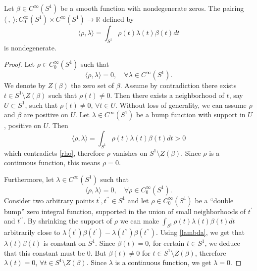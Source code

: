 \documentclass[10pt,a4paper]{amsart}
\newcommand\RR{\mathbb R}
\begin{document}
\begin{lemma}
Let $\beta \in C^\infty(S^1)$ be a smooth function with nondegenerate zeros. The pairing $\langle \ , \ \rangle: C_0^\infty(S^1) \times C^\infty(S^1) \to \RR$ defined by
\begin{equation}\label{pairing}
\langle\rho, \lambda\rangle = \int_{S^1}\rho(t)\lambda(t)\beta(t)dt
\end{equation}
is nondegenerate.
\end{lemma}

\begin{proof}
Let $\rho\in C_0^\infty(S^1)$ such that 
\begin{equation}\label{rho}
\langle\rho,\lambda\rangle = 0, \quad \forall \lambda \in C^\infty(S^1).
\end{equation} 
We denote by $Z(\beta)$ the zero set of $\beta$. Assume by contradiction there exists $t \in S^1\setminus Z(\beta)$ such that $\rho(t) \neq 0$. Then there exists a neighborhood of $t$, say $U \subset S^1$, such that $\rho(t) \neq 0$, $\forall t \in U$. Without loss of generality, we can assume $\rho$ and $\beta$ are positive on $U$. Let $\lambda \in C^\infty(S^1)$ be a bump function with support in $U$, positive on $U$. Then 
\begin{equation*}
\langle\rho, \lambda\rangle = \int_{S^1}\rho(t)\lambda(t)\beta(t)dt > 0
\end{equation*}
which contradicts \eqref{rho}, therefore $\rho$ vanishes on $S^1\setminus Z(\beta)$. Since $\rho$ is a continuous function, this means $\rho = 0$. 

Furthermore, let $\lambda \in C^\infty(S^1)$ such that 
\begin{equation}\label{lambda}
\langle\rho, \lambda\rangle = 0, \quad \forall \rho \in C_0^\infty(S^1). 
\end{equation}
Consider two arbitrary points $t^\prime, t^{\prime\prime} \in S^1$ and let $\rho \in C_0^\infty(S^1)$ be a ``double bump'' zero integral function, supported in the union of small neighborhoods of $t^\prime$ and $t^{\prime\prime}$. By shrinking the support of $\rho$ we can make $\int_{S^1}\rho(t)\lambda(t)\beta(t)dt$ arbitrarily close to $\lambda(t^\prime)\beta(t^\prime) - \lambda(t^{\prime\prime})\beta(t^{\prime\prime})$. Using \eqref{lambda}, we get that $\lambda(t)\beta(t)$ is constant on $S^1$. Since $\beta(t) = 0$, for certain $t \in S^1$, we deduce that this constant must be 0. But $\beta(t) \neq 0$ for $t \in S^1 \setminus Z(\beta)$, therefore $\lambda(t) = 0$, $\forall t \in S^1\setminus Z(\beta)$. Since $\lambda$ is a continuous function, we get $\lambda = 0$. 
\end{proof}
\end{document}
